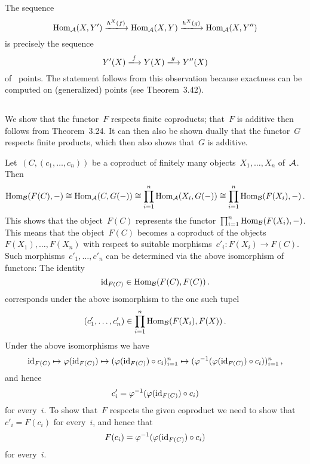 \section{}





\subsection{}

The sequence
\[
  \Hom_\Acat(X, Y')
  \xlongto{h^X(f)}
  \Hom_\Acat(X, Y)
  \xlongto{h^X(g)}
  \Hom_\Acat(X, Y'')
\]
is precisely the sequence
\[
  Y'(X)
  \xlongto{f}
  Y(X)
  \xlongto{g}
  Y''(X)
\]
of~ points.
The statement follows from this observation because exactness can be computed on (generalized) points (see Theorem~3.42).





\subsection{}

We show that the functor~$F$ respects finite coproducts; that~$F$ is additive then follows from Theorem~3.24.
It can then also be shown dually that the functor~$G$ respects finite products, which then also shows that~$G$ is additive.

Let~$(C, (c_1, \dotsc, c_n))$ be a coproduct of finitely many objects~$X_1, \dotsc, X_n$ of~$\mathcal{A}$.
Then
\[
  \operatorname{Hom}_{\mathcal{B}}(F(C), -)
  \cong
  \operatorname{Hom}_{\mathcal{A}}(C, G(-))
  \cong
  \prod_{i=1}^n \operatorname{Hom}_{\mathcal{A}}(X_i, G(-))
  \cong
  \prod_{i=1}^n \operatorname{Hom}_{\mathcal{B}}(F(X_i), -) \,.
\]
This shows that the object~$F(C)$ represents the functor~$\prod_{i=1}^n \operatorname{Hom}_{\mathcal{B}}(F(X_i), -)$.
This means that the object~$F(C)$ becomes a coproduct of the objects~$F(X_1), \dotsc, F(X_n)$ with respect to suitable morphisms~$c'_i \colon F(X_i) \to F(C)$.
Such morphisms~$c'_1, \dotsc, c'_n$ can be determined via the above isomorphism of functors:
The identity
\[
  \operatorname{id}_{F(C)}
  \in
  \operatorname{Hom}_{\mathcal{B}}(F(C), F(C))  \,.
\]
corresponds under the above isomorphism to the one such tupel
\[
  (c'_1, \dotsc, c'_n)
  \in
  \prod_{i=1}^n \operatorname{Hom}_{\mathcal{B}}(F(X_i), F(X))  \,.
\]
Under the above isomorphisms we have
\[
  \operatorname{id}_{F(C)}
  \mapsto
  \varphi(\operatorname{id}_{F(C)})
  \mapsto
  ( \varphi(\operatorname{id}_{F(C)}) \circ c_i )_{i=1}^n
  \mapsto
  ( \varphi^{-1}(\varphi(\operatorname{id}_{F(C)}) \circ c_i) )_{i=1}^n \,,
\]
and hence
\[
  c'_i
  =
  \varphi^{-1}(\varphi(\operatorname{id}_{F(C)}) \circ c_i)
\]
for every~$i$.
To show that~$F$ respects the given coproduct we need to show that~$c'_i = F(c_i)$ for every~$i$, and hence that
\[
  F(c_i)
  =
  \varphi^{-1}(\varphi(\operatorname{id}_{F(C)}) \circ c_i)
\]
for every~$i$.

